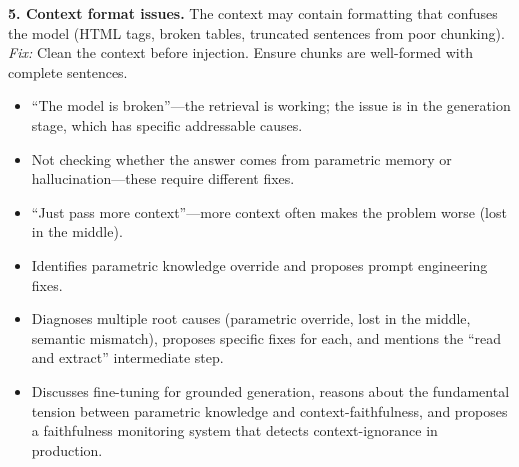 \begin{interviewq}
\textbf{5. Context format issues.} The context may contain formatting that confuses the model (HTML tags, broken tables, truncated sentences from poor chunking).
\textit{Fix:} Clean the context before injection. Ensure chunks are well-formed with complete sentences.

\redflags
\begin{itemize}
    \item ``The model is broken''---the retrieval is working; the issue is in the generation stage, which has specific addressable causes.
    \item Not checking whether the answer comes from parametric memory or hallucination---these require different fixes.
    \item ``Just pass more context''---more context often makes the problem worse (lost in the middle).
\end{itemize}


\goodgreat
\begin{itemize}
    \item {} Identifies parametric knowledge override and proposes prompt engineering fixes.
    \item {} Diagnoses multiple root causes (parametric override, lost in the middle, semantic mismatch), proposes specific fixes for each, and mentions the ``read and extract'' intermediate step.
    \item {} Discusses fine-tuning for grounded generation, reasons about the fundamental tension between parametric knowledge and context-faithfulness, and proposes a faithfulness monitoring system that detects context-ignorance in production.
\end{itemize}

\end{interviewq}


